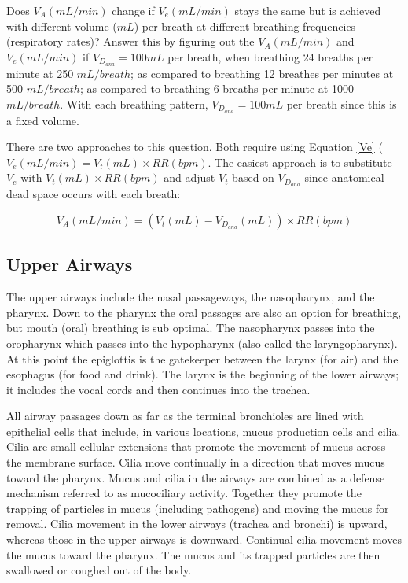 Does $V_A (mL/min)$ change if $V_e (mL/min)$ stays the same but is achieved with different volume ($mL$) per breath at different breathing frequencies (respiratory rates)? Answer this by figuring out the $V_A (mL/min)$ and $V_e (mL/min)$ if $V_D_{ana} = 100 mL$ per breath, when breathing 24 breaths per minute at 250 $mL/breath$; as compared to breathing 12 breathes per minutes at 500 $mL/breath$; as compared to breathing 6 breaths per minute at 1000 $mL/breath$. With each breathing pattern, $V_D_{ana} = 100 mL$ per breath since this is a fixed volume.

There are two approaches to this question. Both require using Equation \ref{Ve} ($V_e (mL/min) = V_t (mL) \times RR (bpm)$. The easiest approach is to substitute $V_e$ with $V_t (mL) \times RR (bpm)$ and adjust $V_t$ based on $V_D_{ana}$ since anatomical dead space occurs with each breath:

\begin{equation}
    V_A (mL/min) = (V_t (mL) - V_D_{ana}(mL)) \times RR (bpm)
\end{equation}

\subsection{Upper Airways}

The upper airways include the nasal passageways, the nasopharynx, and the pharynx. Down to the pharynx the oral passages are also an option for breathing, but mouth (oral) breathing is sub optimal. The nasopharynx passes into the oropharynx which passes into the hypopharynx (also called the laryngopharynx). At this point the epiglottis is the gatekeeper between the larynx (for air) and the esophagus (for food and drink).  The larynx is the beginning of the lower airways; it includes the vocal cords and then continues into the trachea. 

All airway passages down as far as the terminal bronchioles are lined with epithelial cells that include, in various locations, mucus production cells and cilia. Cilia are small cellular extensions that promote the movement of mucus across the membrane surface. Cilia move continually in a direction that moves mucus toward the pharynx. Mucus and cilia in the airways are combined as a defense mechanism referred to as mucociliary activity. Together they promote the trapping of particles in mucus (including pathogens) and moving the mucus for removal. Cilia movement in the lower airways (trachea and bronchi) is upward, whereas those in the upper airways is downward. Continual cilia movement moves the mucus toward the pharynx. The mucus and its trapped particles are then swallowed or coughed out of the body.

